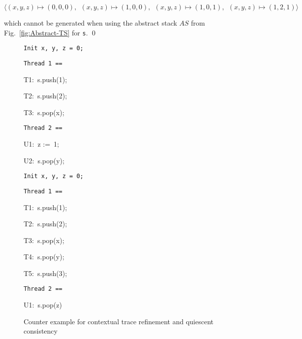 \documentclass[11pt]{llncs}
\def \asgn  {{\;:=\;}}
\newcommand{\reffig}[1]{Fig.~\ref{#1}}
\begin{document}
  \noindent\hfill$
  \langle (x, y, z) \mapsto (0, 0, 0), \ \ (x, y, z) \mapsto (1,0,0),
  \ \ (x, y, z) \mapsto (1,0,1), \ \ (x, y, z) \mapsto
  (1,2,1)\rangle$\hfill\smallskip
  
  \noindent which cannot be generated when using the abstract
  stack $AS$ from \reffig{fig:Abstract-TS} for {\tt s}. \hfill \qed \smallskip

\begin{figure}[t]
  \noindent
  \begin{minipage}[b]{0.46\linewidth}
    \small{\tt Init x, y, z = 0;}
    
    \begin{minipage}[t]{0.48\columnwidth}
      \small\tt Thread 1 ==
      
      T1:\ s.push(1);
      
      T2:\ s.push(2);
      
      T3:\ s.pop(x);
      


    \end{minipage}
    \hfill
    \begin{minipage}[t]{0.48\columnwidth}
      \small\tt Thread 2 ==
      
      U1:\ z \asgn\ 1;
      
      U2:\ s.pop(y);
      
\end{minipage}
    \caption{Counter example for contextual trace refinement and
      sequential consistency}
    \label{fig:ce-sc}
  \end{minipage}
  \hfill
  \begin{minipage}[b]{0.45\linewidth}
    \small{\tt Init x, y, z = 0;}
    
    \begin{minipage}[t]{0.49\linewidth}
      \small\tt Thread 1 ==
      
      T1:\ s.push(1);
      


      T2:\ s.push(2);
      
      T3:\ s.pop(x);
      


      T4:\ s.pop(y);
       


        T5:\ s.push(3);
        
      \end{minipage}
      \hfill 
      \begin{minipage}[t]{0.45\columnwidth}
        \small\tt Thread 2 ==
        
        U1:\ s.pop(z)
        
      \end{minipage}
      \caption{Counter example for contextual trace refinement and
        quiescent consistency}
    \label{fig:ce-qc}
    \end{minipage}
    \vspace{-4mm}
\end{figure}
\end{document}
